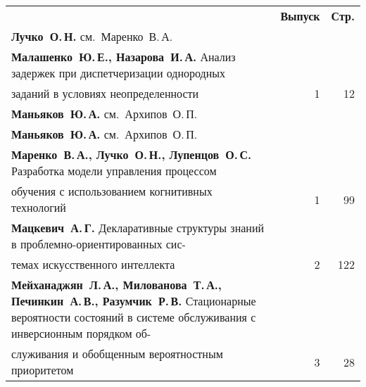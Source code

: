 \pagebreak

\def\leftkol{АВТОРСКИЙ УКАЗАТЕЛЬ ЗА 2014 г.} %

\def\rightkol{АВТОРСКИЙ УКАЗАТЕЛЬ ЗА 2014 г.} %

\def\leftfootline{\small{\textbf{\thepage}
\hfill ИНФОРМАТИКА И ЕЁ ПРИМЕНЕНИЯ\ \ \ том~8\ \ \ выпуск~4\ \ \ 2014}
}%
 \def\rightfootline{\small{ИНФОРМАТИКА И ЕЁ ПРИМЕНЕНИЯ\ \ \ том~8\ \ \ выпуск~4\ \ \ 2014
 \hfill \textbf{\thepage}}}


{\tabcolsep=3pt
\begin{tabular}{p{388pt}rr}
&\textbf{Выпуск} & \textbf{Стр.}\\[3pt]
\textbf{Лучко~О.\,Н.} см.\ Маренко~В.\,А.&&\\
\textbf{Малашенко~Ю.\,Е., Назарова~И.\,А.} Анализ задержек при диспетчеризации
однородных\linebreak
\vspace*{-12pt}\\
\hspace*{23pt}заданий в условиях неопределенности\dotfill&1&12\\
\textbf{Маньяков~Ю.\,А.} см.\ Архипов~О.\,П.&&\\
\textbf{Маньяков~Ю.\,А.} см.\ Архипов~О.\,П.&&\\
\textbf{Маренко~В.\,А., Лучко~О.\,Н., Лупенцов~О.\,С.} Разработка модели управления
процессом\linebreak
\vspace*{-12pt}\\
\hspace*{23pt}обучения с использованием когнитивных технологий\dotfill&1&99\\
\textbf{Мацкевич~А.\,Г.} Декларативные структуры знаний в проблемно-ориентированных
сис-\linebreak
\vspace*{-12pt}\\
\hspace*{23pt}те\-мах искусственного интеллекта\dotfill&2&122\\
\hangindent=23pt\noindent\textbf{Мейханаджян~Л.\,А., Милованова~Т.\,А., Печинкин~А.\,В., Разумчик~Р.\,В.}
Стационарные вероятности состояний в системе обслуживания с инверсионным порядком
об-\linebreak
\vspace*{-12pt}\\
\hspace*{23pt}слу\-жи\-ва\-ния и обобщенным вероятностным приоритетом\dotfill&3&28\\

\end{tabular}}
